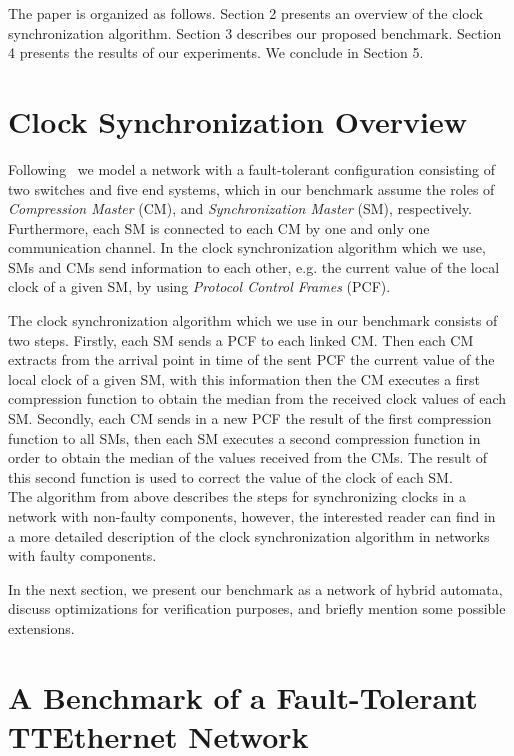 The paper is organized as follows. Section 2 presents an overview of the
clock synchronization algorithm. Section 3 describes our proposed benchmark. 
Section 4 presents the results of our experiments. We conclude in Section 5.
  
\section{Clock Synchronization Overview}
\label{sec:clocksyncoverview}

Following~\cite{Steiner2} we model a network with a fault-tolerant configuration 
consisting of two switches and five end systems, which in our benchmark assume 
the roles of \emph{Compression Master} (CM), and \emph{Synchronization Master} (SM), 
respectively. Furthermore, each SM is connected to each CM by one and only one communication channel.
In the clock synchronization algorithm which we use, SMs and CMs send information to each other, 
e.g. the current value of the local clock of a given SM, by using \emph{Protocol Control Frames} (PCF).

The clock synchronization algorithm which we use in our benchmark consists of two steps. Firstly, 
each SM sends a PCF to each linked CM. Then each CM extracts from the arrival point in time
of the sent PCF the current value of the local clock of a given SM, 
with this information then the CM executes a first compression function to obtain the median 
from the received clock values of each SM. Secondly, each CM sends in a new PCF the result of 
the first compression function to all SMs, then each SM executes a second compression function
in order to obtain the median of the values received from the CMs. The result of this 
second function is used to correct the value of the clock of each SM. \\
%
The algorithm from above describes the steps for synchronizing clocks in a  
network with non-faulty components, however, the interested reader can find 
in~\cite{Steiner2} a more detailed description of the clock synchronization 
algorithm in networks with faulty components.  

In the next section, we present our benchmark as a network of hybrid automata, 
discuss optimizations for verification purposes, and briefly mention
some possible extensions. 

\section{A Benchmark of a Fault-Tolerant TTEthernet Network}

